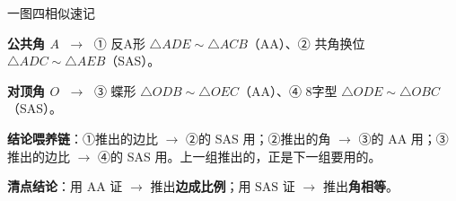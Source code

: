 \documentclass{exam-zh}
\begin{document}
\begin{eduDualExplain}
  \begin{eduExplainLeft}
  \end{eduExplainLeft}

  \begin{eduExplainRight}
      
      
      
  \end{eduExplainRight}
\end{eduDualExplain}




\begin{eduSummaryBlock}{\eduIconPin}{一图四相似速记}
\begin{eduBulletList}
  \item \textbf{公共角 $A$} $\;\to\;$ ① 反A形 $\triangle ADE\sim\triangle ACB$（AA）、② 共角换位 $\triangle ADC\sim\triangle AEB$（SAS）。  \item \textbf{对顶角 $O$} $\;\to\;$ ③ 蝶形 $\triangle ODB\sim\triangle OEC$（AA）、④ 8字型 $\triangle ODE\sim\triangle OBC$（SAS）。  \item \textbf{结论喂养链}：①推出的边比 $\to$ ②的 SAS 用；②推出的角 $\to$ ③的 AA 用；③推出的边比 $\to$ ④的 SAS 用。上一组推出的，正是下一组要用的。  \item \textbf{清点结论}：用 $\text{AA}$ 证 $\to$ 推出\textbf{边成比例}；用 $\text{SAS}$ 证 $\to$ 推出\textbf{角相等}。\end{eduBulletList}
\end{eduSummaryBlock}
\end{document}

